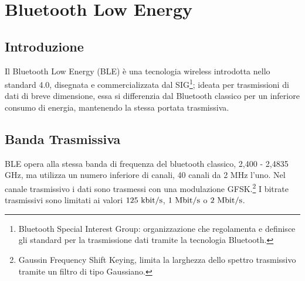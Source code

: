 
\section{Bluetooth Low Energy}
\subsection{Introduzione}
Il Bluetooth Low Energy (BLE) è una tecnologia wireless introdotta nello standard 4.0, disegnata e commercializzata dal SIG\footnote{Bluetooth Special Interest Group: organizzazione che regolamenta e definisce gli standard  per la trasmissione dati tramite la tecnologia Bluetooth.}; ideata per trasmissioni di dati di breve dimensione, essa si differenzia dal Bluetooth classico per un inferiore consumo di energia, mantenendo la stessa portata trasmissiva.

\subsection{Banda Trasmissiva}
BLE opera alla stessa banda di frequenza del bluetooth classico,  2,400 - 2,4835 GHz, ma utilizza un numero inferiore di canali, 40 canali da 2 \si{\mega\hertz} l'uno.
Nel canale trasmissivo i dati sono trasmessi con una modulazione GFSK.\footnote{Gaussin Frequency Shift Keying, limita la larghezza dello spettro trasmissivo tramite un filtro di tipo Gaussiano.}
I bitrate trasmissivi sono limitati ai valori ${125\ \si{\kilo\bit/s}}$, ${1\ \si{\mega\bit/s}}$ o ${2\ \si{\mega\bit/s}}$.

